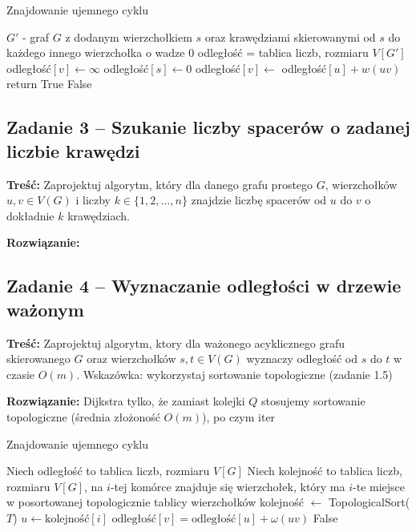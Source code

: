 \begin{algorithm}[H]
	\caption{Znajdowanie ujemnego cyklu}
	\begin{algorithmic}[1]
		\State $G'$ - graf $G$ z dodanym wierzchołkiem $s$
		oraz krawędziami skierowanymi od $s$ do każdego innego
		wierzchołka o wadze $0$
		\State odległość = tablica liczb, rozmiaru $V[G']$
		\State odległość$[v]\gets\infty$
		\EndFor
		\State odległość$[s]\gets0$
		\State odległość$[v]\gets$ odległość$[u] + w(uv)$ 
		\EndIf
		\EndFor
		\EndFor
		\State return True
		\EndIf
		\EndFor
		\State \Return False
		\EndProcedure
	\end{algorithmic}
	\label{Zadanie32}
\end{algorithm}

\subsection{Zadanie 3 -- Szukanie liczby spacerów o zadanej liczbie krawędzi}
\textbf{Treść: }
Zaprojektuj algorytm, który dla danego grafu prostego 
$G$, wierzchołków $u, v \in V(G)$ i liczby $k \in
\{1, 2, \ldots , n\}$ znajdzie liczbę spacerów 
od $u$ do $v$ o dokładnie $k$ krawędziach.

\textbf{Rozwiązanie: }

\subsection{Zadanie 4 -- Wyznaczanie odległości w drzewie ważonym}
\textbf{Treść: } Zaprojektuj algorytm, ktory dla ważonego 
acyklicznego grafu skierowanego $G$ oraz wierzchołków $s, t \in
V(G)$ wyznaczy odległość od $s$ do $t$ w czasie $O(m)$. 
Wskazówka: wykorzystaj sortowanie topologiczne (zadanie 1.5)

\textbf{Rozwiązanie: }
Dijkstra tylko, że zamiast kolejki $Q$ stosujemy
sortowanie topologiczne (średnia złożoność $O(m)$), 
po czym iter
\begin{algorithm}[H]
	\caption{Znajdowanie ujemnego cyklu}
	\begin{algorithmic}[1]
		\State Niech odległość to tablica liczb, rozmiaru $V[G]$
		\State Niech kolejność to tablica liczb, rozmiaru $V[G]$, na
		$i$-tej komórce znajduje się wierzchołek, który ma 
		$i$-te miejsce w posortowanej topologicznie tablicy wierzchołków
		\State kolejność $\gets$ TopologicalSort($T$)
		\State $u \gets \text{kolejność}[i]$
		\State $\text{odległość}[v] = \text{odległość}[u] + \omega(uv)$
		\EndIf
		\EndFor 
		\EndFor
		\State \Return False
		\EndProcedure
	\end{algorithmic}
	\label{Zadanie34}
\end{algorithm}

